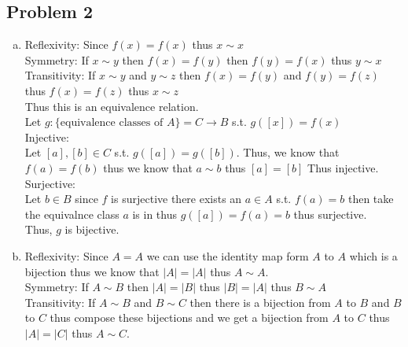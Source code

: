 \documentclass[12pt, letterpaper]{article}
\theoremstyle{definition}
\begin{document}
\subsection*{Problem 2}
\begin{enumerate}[(a)]
    \item Reflexivity: Since $f(x)=f(x)$ thus $x \sim x$\\
    Symmetry: If $x \sim y$ then $f(x)=f(y)$ then $f(y)=f(x)$ thus $y \sim x$\\
    Transitivity: If $x \sim y$ and $y \sim z$ then $f(x)=f(y)$ and $f(y)=f(z)$ thus $f(x)=f(z)$ thus $x \sim z$\\
    Thus this is an equivalence relation.\\
    Let $g: \{\text{equivalence classes of $A$}\}=C \to B$ s.t. $g([x])=f(x)$\\
    Injective:\\
    Let $[a],[b] \in C$ s.t. $g([a])=g([b])$. Thus, we know that $f(a)=f(b)$ thus we know that $a \sim b$ thus $[a]=[b]$ Thus injective.\\
    Surjective:\\
    Let $b \in B$ since $f$ is surjective there exists an $a \in A$ s.t. $f(a)=b$ then take the equivalnce class $a$ is in thus $g([a])=f(a)=b$ thus surjective.\\
    Thus, $g$ is bijective.
    \item Reflexivity: Since $A=A$ we can use the identity map form $A$ to $A$ which is a bijection thus we know that $|A|=|A|$ thus $A \sim A$.\\
    Symmetry: If $A \sim B$ then $|A|=|B|$ thus $|B|=|A|$ thus $B \sim A$\\
    Transitivity: If $A \sim B$ and $B \sim C$ then there is a bijection from $A$ to $B$ and $B$ to $C$ thus compose these bijections and we get a bijection from $A$ to $C$ thus $|A|=|C|$ thus $A \sim C$.
\end{enumerate}

\newpage
\end{document}
